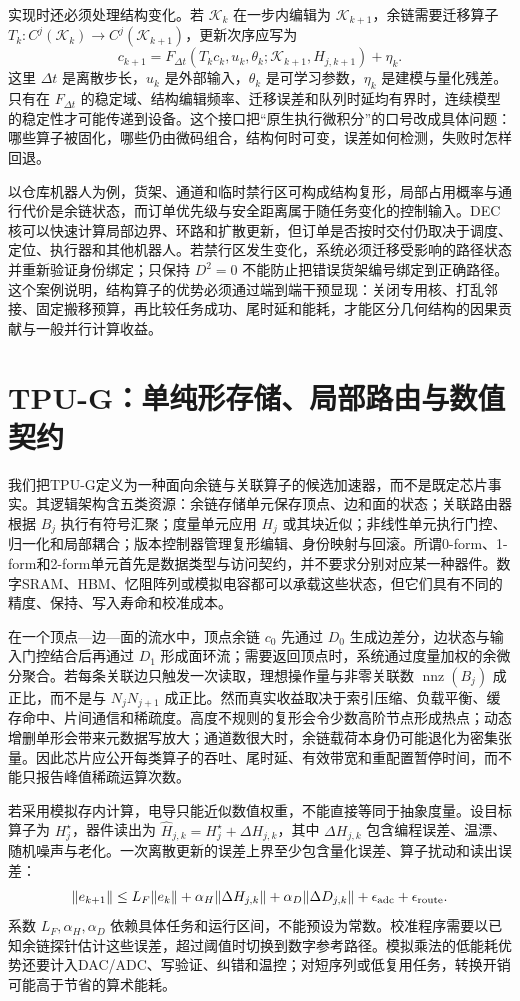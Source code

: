 实现时还必须处理结构变化。若 $\mathcal K_k$ 在一步内编辑为 $\mathcal K_{k+1}$，余链需要迁移算子 $T_k:C^j(\mathcal K_k)\to C^j(\mathcal K_{k+1})$，更新次序应写为
\[
c_{k+1}=F_{\Delta t}\!\left(T_kc_k,u_k,\theta_k;\mathcal K_{k+1},H_{j,k+1}\right)+\eta_k .
\]
这里 $\Delta t$ 是离散步长，$u_k$ 是外部输入，$\theta_k$ 是可学习参数，$\eta_k$ 是建模与量化残差。只有在 $F_{\Delta t}$ 的稳定域、结构编辑频率、迁移误差和队列时延均有界时，连续模型的稳定性才可能传递到设备。这个接口把“原生执行微积分”的口号改成具体问题：哪些算子被固化，哪些仍由微码组合，结构何时可变，误差如何检测，失败时怎样回退。

以仓库机器人为例，货架、通道和临时禁行区可构成结构复形，局部占用概率与通行代价是余链状态，而订单优先级与安全距离属于随任务变化的控制输入。DEC核可以快速计算局部边界、环路和扩散更新，但订单是否按时交付仍取决于调度、定位、执行器和其他机器人。若禁行区发生变化，系统必须迁移受影响的路径状态并重新验证身份绑定；只保持 $D^2=0$ 不能防止把错误货架编号绑定到正确路径。这个案例说明，结构算子的优势必须通过端到端干预显现：关闭专用核、打乱邻接、固定搬移预算，再比较任务成功、尾时延和能耗，才能区分几何结构的因果贡献与一般并行计算收益。

\section{TPU-G：单纯形存储、局部路由与数值契约}
\label{sec:section_6771}

我们把TPU-G定义为一种面向余链与关联算子的候选加速器，而不是既定芯片事实。其逻辑架构含五类资源：余链存储单元保存顶点、边和面的状态；关联路由器根据 $B_j$ 执行有符号汇聚；度量单元应用 $H_j$ 或其块近似；非线性单元执行门控、归一化和局部耦合；版本控制器管理复形编辑、身份映射与回滚。所谓0-form、1-form和2-form单元首先是数据类型与访问契约，并不要求分别对应某一种器件。数字SRAM、HBM、忆阻阵列或模拟电容都可以承载这些状态，但它们具有不同的精度、保持、写入寿命和校准成本。

在一个顶点—边—面的流水中，顶点余链 $c_0$ 先通过 $D_0$ 生成边差分，边状态与输入门控结合后再通过 $D_1$ 形成面环流；需要返回顶点时，系统通过度量加权的余微分聚合。若每条关联边只触发一次读取，理想操作量与非零关联数 $\operatorname{nnz}(B_j)$ 成正比，而不是与 $N_jN_{j+1}$ 成正比。然而真实收益取决于索引压缩、负载平衡、缓存命中、片间通信和稀疏度。高度不规则的复形会令少数高阶节点形成热点；动态增删单形会带来元数据写放大；通道数很大时，余链载荷本身仍可能退化为密集张量。因此芯片应公开每类算子的吞吐、尾时延、有效带宽和重配置暂停时间，而不能只报告峰值稀疏运算次数。

若采用模拟存内计算，电导只能近似数值权重，不能直接等同于抽象度量。设目标算子为 $H_j^\star$，器件读出为 $\widehat H_{j,k}=H_j^\star+\Delta H_{j,k}$，其中 $\Delta H_{j,k}$ 包含编程误差、温漂、随机噪声与老化。一次离散更新的误差上界至少包含量化误差、算子扰动和读出误差：
\[
\|e_{k+1}\|\leq
L_F\|e_k\|+
\alpha_H\|\Delta H_{j,k}\|+
\alpha_D\|\Delta D_{j,k}\|+
\epsilon_{\rm adc}+\epsilon_{\rm route}.
\]
系数 $L_F,\alpha_H,\alpha_D$ 依赖具体任务和运行区间，不能预设为常数。校准程序需要以已知余链探针估计这些误差，超过阈值时切换到数字参考路径。模拟乘法的低能耗优势还要计入DAC/ADC、写验证、纠错和温控；对短序列或低复用任务，转换开销可能高于节省的算术能耗。

